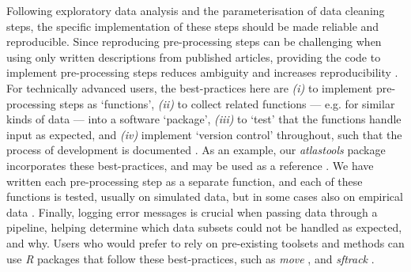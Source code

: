\begin{refsection}
    Following exploratory data analysis and the parameterisation of data cleaning steps, the specific implementation of these steps should be made reliable and reproducible.
    Since reproducing pre-processing steps can be challenging when using only written descriptions from published articles, providing the code to implement pre-processing steps reduces ambiguity and increases reproducibility \cite{haddaway2015}.
    For technically advanced users, the best-practices here are \textit{(i)} to implement pre-processing steps as `functions', \textit{(ii)} to collect related functions --- e.g. for similar kinds of data --- into a software `package', \textit{(iii)} to `test' that the functions handle input as expected, and \textit{(iv)} implement `version control' throughout, such that the process of development is documented \cite[Fig.~\ref{fig1};][]{wickham2015,alston2020,perez-riverol2016}.
    As an example, our \textit{atlastools} package incorporates these best-practices, and may be used as a reference \cite[][]{gupte2020a}.
    We have written each pre-processing step as a separate function, and each of these functions is tested, usually on simulated data, but in some cases also on empirical data \cite[][see the directory \textit{tests/} in the associated Zenodo repository]{wickham2015}.
    Finally, logging error messages is crucial when passing data through a pipeline, helping determine which data subsets could not be handled as expected, and why.
    Users who would prefer to rely on pre-existing toolsets and methods can use \textit{R} packages that follow these best-practices, such as \textit{move} \cite{kranstauber2011}, and \textit{sftrack} \cite{boone2020}.


\end{refsection}
